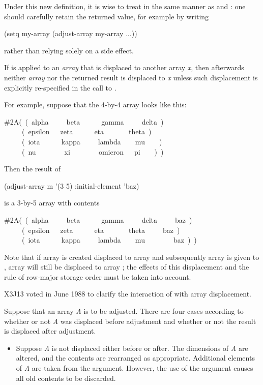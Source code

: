 \begin{defun}[Function]
\begin{newer}
Under this new definition, it is wise to treat 
in the same manner as  and : one should carefully
retain the returned value, for example by writing
\begin{lisp}
(setq my-array (adjust-array my-array ...))
\end{lisp}
rather than relying solely on a side effect.
\end{newer}

If  is applied to an {\it array} that is displaced
to another array {\it x}, then afterwards neither {\it array} nor the returned
result is displaced to {\it x} unless such displacement is explicitly
re-specified in the call to .

For example, suppose that the 4-by-4 array  looks like this:
\begin{lisp}
\#2A(~(~alpha~~~~~beta~~~~~~gamma~~~~~delta~) \\
~~~~~(~epsilon~~~zeta~~~~~~eta~~~~~~~theta~) \\
~~~~~(~iota~~~~~~kappa~~~~~lambda~~~~mu~~~~) \\
~~~~~(~nu~~~~~~~~xi~~~~~~~~omicron~~~pi~~~~)~)
\end{lisp}
Then the result of
\begin{lisp}
(adjust-array m '(3 5) :initial-element 'baz)
\end{lisp}
is a 3-by-5 array with contents
\begin{lisp}
\#2A(~(~alpha~~~~~beta~~~~~~gamma~~~~~delta~~~~~baz~) \\
~~~~~(~epsilon~~~zeta~~~~~~eta~~~~~~~theta~~~~~baz~) \\
~~~~~(~iota~~~~~~kappa~~~~~lambda~~~~mu~~~~~~~~baz~)~)
\end{lisp}
Note that if array  is created displaced to array  and subsequently
array  is given to , array  will still be
displaced to array ; the effects of this displacement and
the rule of row-major storage order must be taken into account.

\begin{newer}
X3J13 voted in June 1988 
to clarify the interaction of  with array displacement.

Suppose that an array {\it A} is to be adjusted.  There are four cases
according to whether or not {\it A} was displaced before adjustment
and whether or not the result is displaced after adjustment.
\begin{itemize}
\item
Suppose {\it A} is not displaced either before or after.
The dimensions of {\it A} are altered, and
the contents are rearranged as appropriate.  Additional elements of {\it A}
are taken from the  argument.
However, the use of the  argument causes all old
contents to be discarded.


\end{itemize}
\end{newer}
\end{defun}
